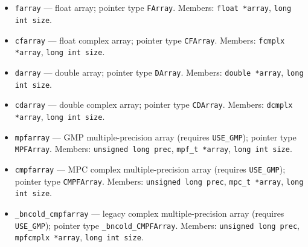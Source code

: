 \subsection{}

\begin{itemize}
    \item \texttt{farray} --- float array; pointer type \texttt{FArray}.
        Members: \texttt{float *array}, \texttt{long int size}.
    \item \texttt{cfarray} --- float complex array; pointer type \texttt{CFArray}.
        Members: \texttt{fcmplx *array}, \texttt{long int size}.
    \item \texttt{darray} --- double array; pointer type \texttt{DArray}.
        Members: \texttt{double *array}, \texttt{long int size}.
    \item \texttt{cdarray} --- double complex array; pointer type \texttt{CDArray}.
        Members: \texttt{dcmplx *array}, \texttt{long int size}.
    \item \texttt{mpfarray} --- GMP multiple-precision array (requires \texttt{USE\_GMP}); pointer type \texttt{MPFArray}.
        Members: \texttt{unsigned long prec}, \texttt{mpf\_t *array}, \texttt{long int size}.
    \item \texttt{cmpfarray} --- MPC complex multiple-precision array (requires \texttt{USE\_GMP}); pointer type \texttt{CMPFArray}.
        Members: \texttt{unsigned long prec}, \texttt{mpc\_t *array}, \texttt{long int size}.
    \item \texttt{\_bncold\_cmpfarray} --- legacy complex multiple-precision array (requires \texttt{USE\_GMP});
        pointer type \texttt{\_bncold\_CMPFArray}.
        Members: \texttt{unsigned long prec}, \texttt{mpfcmplx *array}, \texttt{long int size}.
\end{itemize}

\section{}

\subsection{}

